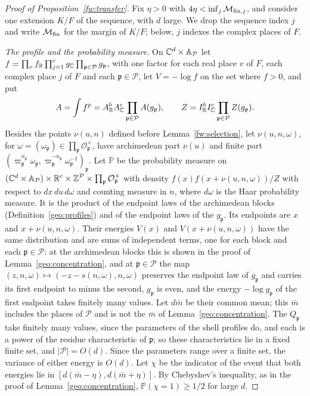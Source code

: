\begin{proof}[Proof of Proposition~\ref{fw:transfer}]
Fix $\eta>0$ with $4\eta<\inf_j\mathcal M_{{\rm fin},j}$, and consider
one extension $K/F$ of the sequence, with $d$ large. We drop the sequence
index $j$ and write $\mathcal M_{\rm fin}$ for the margin of $K/F$;
below, $j$ indexes the complex places of $F$.

\emph{The profile and the probability measure.} On $\mathbb C^d\times\mathbb
A_{\mathcal P}$ let
$f=\prod_vf_\mathbb R\prod_{j=1}^cg_\mathbb C\prod_{\mathfrak p\in\mathcal
P}g_{\mathfrak p}$, with one factor for each real place $v$ of $F$, each
complex place $j$ of $F$ and each $\mathfrak p\in\mathcal P$, let
$V=-\log f$ on the set where $f>0$, and put
\[
 A=\int f^p=A_\mathbb R^bA_\mathbb C^c\prod_{\mathfrak p\in\mathcal P}A(g_{\mathfrak p}),\qquad
 Z=I_\mathbb R^bI_\mathbb C^c\prod_{\mathfrak p\in\mathcal P}Z(g_{\mathfrak p}).
\]
Besides the points $\nu(u,n)$ defined before Lemma~\ref{fw:selection},
let $\nu(u,n,\omega)$, for $\omega=(\omega_{\mathfrak
p})\in\prod_{\mathfrak p}\mathcal O_{\mathfrak p}^\times$, have
archimedean part $\nu(u)$ and finite part $(\varpi_{\mathfrak
p}^{n_{\mathfrak p}}\omega_{\mathfrak p},\varpi_{\mathfrak
p}^{-n_{\mathfrak p}}\omega_{\mathfrak p}^{-1})_{\mathfrak p}$. Let
$\mathbb P$ be the probability measure on $(\mathbb C^d\times\mathbb
A_{\mathcal P})\times\mathbb R^c\times\mathbb Z^{\mathcal P}\times\prod_{\mathfrak
p}\mathcal O_{\mathfrak p}^\times$ with density
$f(x)f(x+\nu(u,n,\omega))/Z$ with respect to $dx\,du\,d\omega$ and
counting measure in $n$, where $d\omega$ is the Haar probability
measure. It is the product of the endpoint laws of the archimedean
blocks (Definition~\ref{geo:profiles}) and of the endpoint laws of the
$g_{\mathfrak p}$. Its endpoints are $x$ and $x+\nu(u,n,\omega)$. Their
energies $V(x)$ and $V(x+\nu(u,n,\omega))$ have the same distribution
and are sums of independent terms, one for each block and each
$\mathfrak p\in\mathcal P$: at the archimedean blocks this is shown in
the proof of Lemma~\ref{geo:concentration}, and at $\mathfrak
p\in\mathcal P$ the map $(z,n,\omega)\mapsto(-z-s(n,\omega),n,\omega)$
preserves the endpoint law of $g_{\mathfrak p}$ and carries its first
endpoint to minus the second, $g_{\mathfrak p}$ is even, and the energy
$-\log g_{\mathfrak p}$ of the first endpoint takes finitely many values.
Let $d\bar m$ be their common mean; this $\bar m$ includes the places of
$\mathcal P$ and is not the $\bar m$ of Lemma~\ref{geo:concentration}.
The $Q_{\mathfrak p}$ take finitely many values, since the parameters of
the shell profiles do, and each is a power of the residue characteristic
of $\mathfrak p$; so these characteristics lie in a fixed finite set,
and $|\mathcal P|=O(d)$. Since the parameters range over a finite set,
the variance of either energy is $O(d)$. Let $\chi$ be the indicator of
the event that both energies lie in $[d(\bar m-\eta),d(\bar m+\eta)]$.
By Chebyshev's inequality, as in the proof of
Lemma~\ref{geo:concentration}, $\mathbb P(\chi=1)\ge1/2$ for large $d$.


\end{proof}
